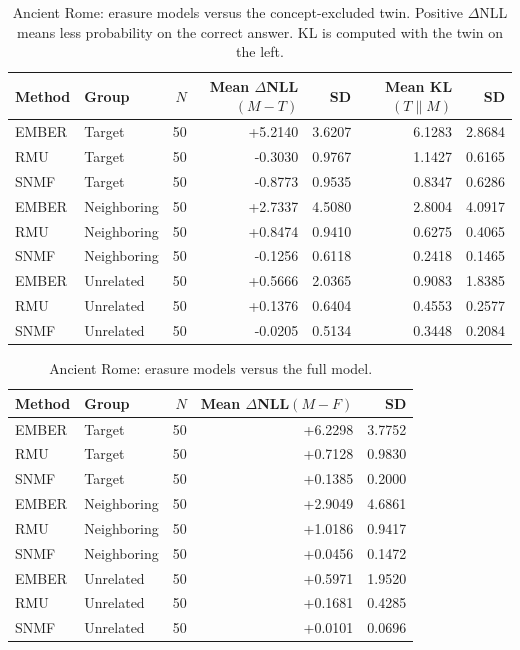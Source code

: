 
\begin{table}[t]
\centering
\small
\begin{tabular}{llrrrrr}
\toprule
Method & Group & $N$ & Mean $\Delta$NLL$(M{-}T)$ & SD & Mean KL$(T\|M)$ & SD \\
\midrule
EMBER & Target & 50 & +5.2140 & 3.6207 & 6.1283 & 2.8684 \\
RMU & Target & 50 & -0.3030 & 0.9767 & 1.1427 & 0.6165 \\
SNMF & Target & 50 & -0.8773 & 0.9535 & 0.8347 & 0.6286 \\
EMBER & Neighboring & 50 & +2.7337 & 4.5080 & 2.8004 & 4.0917 \\
RMU & Neighboring & 50 & +0.8474 & 0.9410 & 0.6275 & 0.4065 \\
SNMF & Neighboring & 50 & -0.1256 & 0.6118 & 0.2418 & 0.1465 \\
EMBER & Unrelated & 50 & +0.5666 & 2.0365 & 0.9083 & 1.8385 \\
RMU & Unrelated & 50 & +0.1376 & 0.6404 & 0.4553 & 0.2577 \\
SNMF & Unrelated & 50 & -0.0205 & 0.5134 & 0.3448 & 0.2084 \\
\bottomrule
\end{tabular}
\caption{Ancient Rome: erasure models versus the concept-excluded twin. Positive $\Delta$NLL means less probability on the correct answer. KL is computed with the twin on the left.}
\label{tab:rome-vs-twin}
\end{table}

\begin{table}[t]
\centering
\small
\begin{tabular}{llrrr}
\toprule
Method & Group & $N$ & Mean $\Delta$NLL$(M{-}F)$ & SD \\
\midrule
EMBER & Target & 50 & +6.2298 & 3.7752 \\
RMU & Target & 50 & +0.7128 & 0.9830 \\
SNMF & Target & 50 & +0.1385 & 0.2000 \\
EMBER & Neighboring & 50 & +2.9049 & 4.6861 \\
RMU & Neighboring & 50 & +1.0186 & 0.9417 \\
SNMF & Neighboring & 50 & +0.0456 & 0.1472 \\
EMBER & Unrelated & 50 & +0.5971 & 1.9520 \\
RMU & Unrelated & 50 & +0.1681 & 0.4285 \\
SNMF & Unrelated & 50 & +0.0101 & 0.0696 \\
\bottomrule
\end{tabular}
\caption{Ancient Rome: erasure models versus the full model.}
\label{tab:rome-vs-full}
\end{table}

